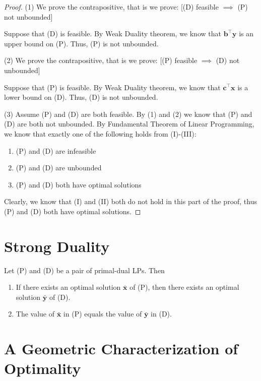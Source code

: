 \begin{proof}
    (1) We prove the contrapositive, that is we prove:
    [(D) feasible $ \implies $ (P) not unbounded]

    Suppose that (D) is feasible. By Weak Duality theorem, we know that
    $ \bm{b}^\top \bm{y} $ is an upper bound on (P). Thus, (P) is not
    unbounded.

    (2) We prove the contrapositive, that is we prove:
    [(P) feasible $ \implies $ (D) not unbounded]

    Suppose that (P) is feasible. By Weak Duality theorem, we know that
    $ \bm{c}^\top \bm{x} $ is a lower bound on (D). Thus, (D) is not
    unbounded.

    (3) Assume (P) and (D) are both feasible. By (1) and (2) we know that
    (P) and (D) are both not unbounded. By Fundamental Theorem of Linear
    Programming, we know that exactly one of the following holds
    from (I)-(III):
    \begin{enumerate}[label=(\Roman*)]
        \item (P) and (D) are infeasible
        \item (P) and (D) are unbounded
        \item (P) and (D) both have optimal solutions
    \end{enumerate}
    Clearly, we know that (I) and (II) both do not hold in this part of the proof,
    thus (P) and (D) both have optimal solutions.
\end{proof}

\section{Strong Duality}
\begin{thmbox}
    \begin{theorem}
        Let (P) and (D) be a pair of primal-dual LPs. Then
        \begin{enumerate}[label=(\arabic*)]
            \item If there exists an optimal solution $ \bm{\bar{x}} $ of (P), then there exists an optimal solution $ \bm{\bar{y}} $ of (D).
            \item The value of $ \bm{\bar{x}} $ in (P) equals the value of $ \bm{\bar{y}} $ in (D).
        \end{enumerate}
    \end{theorem}
\end{thmbox}

\section{A Geometric Characterization of Optimality}

